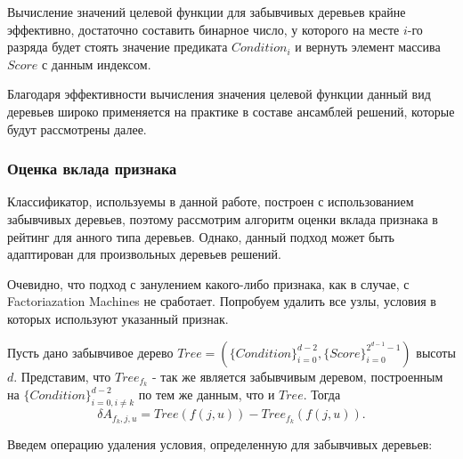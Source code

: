\documentclass[12pt,a4paper]{report}
\begin{document}
Вычисление значений целевой функции для забывчивых деревьев крайне эффективно, достаточно составить бинарное число, у которого на месте $i$-го разряда будет стоять значение предиката $Condition_i$ и вернуть элемент массива $Score$ с данным индексом.

Благодаря эффективности вычисления значения целевой функции данный вид деревьев широко применяется на практике в составе ансамблей решений, которые будут рассмотрены далее.

\subsubsection{Оценка вклада признака}
Классификатор, используемы в данной работе, построен с использованием забывчивых деревьев, поэтому рассмотрим алгоритм оценки вклада признака в рейтинг для анного типа деревьев. Однако, данный подход может быть адаптирован для произвольных деревьев решений.

Очевидно, что подход с занулением какого-либо признака, как в случае, с Factoriazation Machines не сработает. Попробуем удалить все узлы, условия в которых используют указанный признак.

Пусть дано забывчивое дерево $Tree = (\{Condition\}_{i=0}^{d - 2}, \{Score\}_{i=0}^{2^{d - 1} - 1})$ высоты $d$.
Представим, что $Tree_{f_k}$ - так же является забывчивым деревом, построенным на $\{Condition\}_{i=0, i \neq k}^{d - 2}$ по тем же данным, что и $Tree$. Тогда
\begin{equation*}
\delta A_{f_k, j, u} = Tree(f(j, u)) - Tree_{f_k}(f(j, u)).
\end{equation*}

Введем операцию удаления условия, определенную для забывчивых деревьев:
\end{document}
